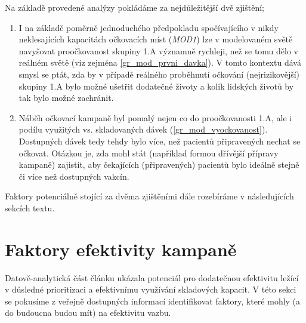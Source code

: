 Na základě provedené analýzy pokládáme za nejdůležitější dvě zjištění;
\begin{enumerate}
\item I na základě poměrně jednoduchého předpokladu spočívajícího v nikdy neklesajících kapacitách očkovacích míst (\emph{MOD1}) lze v modelovaném světě navyšovat proočkovanost skupiny 1.A významně rychleji, než se tomu dělo v reálném světě (viz zejména  \ref{gr_mod_prvni_davka}). V tomto kontextu dává smysl se ptát, zda by v případě reálného proběhnutí očkování (nejrizikovější) skupiny 1.A bylo možné ušetřit dodatečné životy a kolik lidských životů by tak bylo možné zachránit.
\item Náběh očkovací kampaně byl pomalý nejen co do proočkovanosti 1.A, ale i podílu využitých vs. skladovaných dávek (\ref{gr_mod_vyockovanost}). Dostupných dávek tedy tehdy bylo více, než pacientů připravených nechat se očkovat. Otázkou je, zda mohl stát (například formou dřívější přípravy kampaně) zajistit, aby čekajících (připravených) pacientů bylo ideálně stejně či více než dostupných vakcín.
\end{enumerate}
Faktory potenciálně stojící za dvěma zjištěními dále rozebíráme v následujících sekcích textu.






\section*{Faktory efektivity kampaně}
\label{sec:shrnuti}


Datově-analytická část článku ukázala potenciál pro dodatečnou efektivitu ležící v důsledné prioritizaci a efektivnímu využívání skladových kapacit. V této sekci se pokusíme z veřejně dostupných informací identifikovat faktory, které mohly (a do budoucna budou mít) na efektivitu vazbu. %

